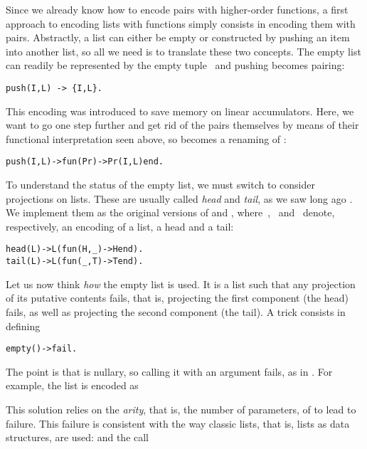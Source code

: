 Since we already know how to encode pairs with higher\hyp{}order
functions, a first approach to encoding lists with functions simply
consists in encoding them with pairs. Abstractly, a list can either be
empty or constructed by pushing an item into another list, so all we
need is to translate these two concepts. The empty list can readily be
represented by the empty tuple~\erlcode{\{\}} and pushing becomes
pairing:
\begin{verbatim}
push(I,L) -> {I,L}.
\end{verbatim}
This encoding was introduced  to save memory
on linear accumulators. Here, we want to go one step further and get
rid of the pairs themselves by means of their functional
interpretation seen above, so  becomes a renaming of
:
\begin{alltt}
push(I,L) -> fun(Pr) -> Pr(I,L) end.\hfill% \emph{See} mk_pair/2
\end{alltt}
To understand the status of the empty list, we must switch to consider
projections on lists. These are usually called \emph{head} and
\emph{tail}, as we saw long ago . We implement
them as the original versions of  and ,
where~, ~and~ denote, respectively,
an encoding of a list, a head and a tail:
\begin{alltt}
head(L) -> L(fun(H,_) -> H end).\hfill% \emph{See} fst/2
tail(L) -> L(fun(_,T) -> T end).\hfill% \emph{See} snd/2
\end{alltt}
Let us now think \emph{how} the empty list is used. It is a list such
that any projection of its putative contents fails, that is,
projecting the first component (the head) fails, as well as projecting
the second component (the tail). A trick consists in defining
\begin{alltt}
empty() -> fail.\hfill% \emph{The atom} fail \emph{is arbitrary}
\end{alltt}
The point is that  is nullary, so calling it with an
argument fails, as in . For example, the
list \erlcode{[a,b,c]} is encoded as
\begin{center}
\end{center}
This solution relies on the \emph{arity}, that is, the number of
parameters, of  to lead to failure. This failure is
consistent with the way classic lists, that is, lists as data structures,
are used:  and the call 
